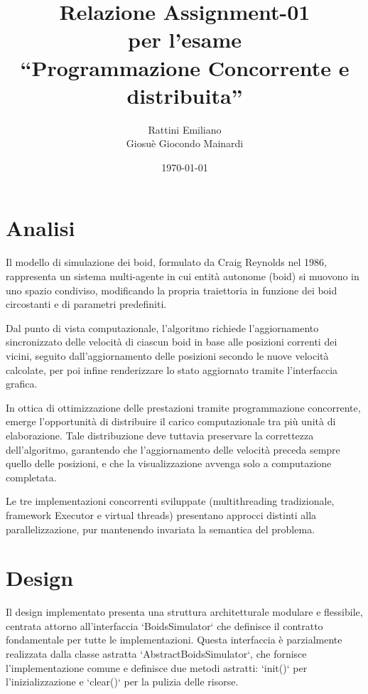 \documentclass[a4paper,12pt]{report}
\title{Relazione Assignment-01 \\ per l'esame \\ ``Programmazione Concorrente e distribuita''}
\author{Rattini Emiliano\\Giosuè Giocondo Mainardi}
\date{\today}
\begin{document}
\maketitle

\tableofcontents

\chapter{Analisi}
Il modello di simulazione dei boid, formulato da Craig Reynolds nel 1986, rappresenta un sistema multi-agente in cui 
entità autonome (boid) si muovono in uno spazio condiviso, modificando la propria traiettoria in funzione dei boid 
circostanti e di parametri predefiniti.

Dal punto di vista computazionale, l'algoritmo richiede l'aggiornamento sincronizzato delle velocità di ciascun boid 
in base alle posizioni correnti dei vicini, seguito dall'aggiornamento delle posizioni secondo le nuove velocità 
calcolate, per poi infine renderizzare lo stato aggiornato tramite l'interfaccia grafica.

In ottica di ottimizzazione delle prestazioni tramite programmazione concorrente, emerge l'opportunità di distribuire 
il carico computazionale tra più unità di elaborazione. Tale distribuzione deve tuttavia preservare la correttezza 
dell'algoritmo, garantendo che l'aggiornamento delle velocità preceda sempre quello delle posizioni, e che la 
visualizzazione avvenga solo a computazione completata.

Le tre implementazioni concorrenti sviluppate (multithreading tradizionale, framework Executor e virtual threads) 
presentano approcci distinti alla parallelizzazione, pur mantenendo invariata la semantica del problema.

\chapter{Design}
Il design implementato presenta una struttura architetturale modulare e flessibile, centrata attorno all'interfaccia `BoidsSimulator` che definisce il contratto fondamentale per tutte le implementazioni. Questa interfaccia è parzialmente realizzata dalla classe astratta `AbstractBoidsSimulator`, che fornisce l'implementazione comune e definisce due metodi astratti: `init()` per l'inizializzazione e `clear()` per la pulizia delle risorse.
\end{document}
